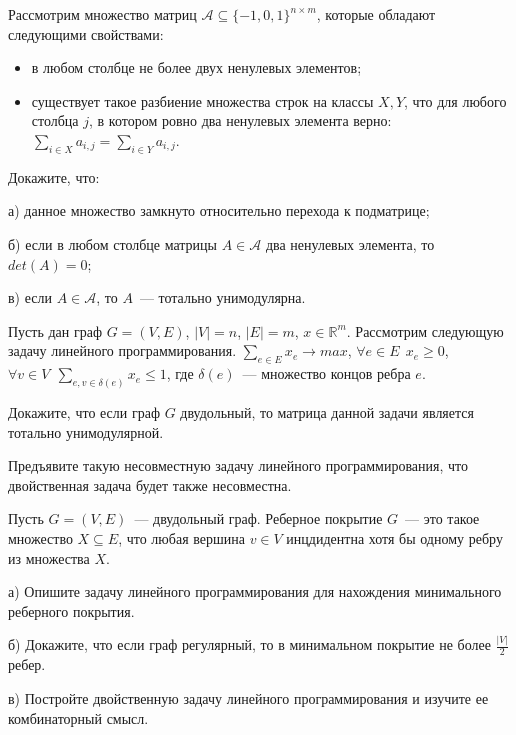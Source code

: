 \setcounter{curtask}{25}


\begin{task}
	Рассмотрим множество матриц $\mathcal{A} \subseteq \{-1, 0, 1\}^{n \times m}$,
	которые обладают следующими свойствами:
    \begin{itemize}
		\item в любом столбце не более двух ненулевых элементов;
    	\item существует такое разбиение множества строк на классы $X, Y$, что
		    для любого столбца $j$, в котором ровно два ненулевых элемента верно:
            $\sum\limits_{i \in X}{a_{i,j}} = \sum\limits_{i \in Y}{a_{i,j}}$.
    \end{itemize}

    Докажите, что:
    
    а) данное множество замкнуто относительно перехода к подматрице;
    
    б) если в любом столбце матрицы $A \in \mathcal{A}$ два ненулевых элемента, то
	$det(A) = 0$;
    
    в) если $A \in \mathcal{A}$, то $A$~--- тотально унимодулярна.
\end{task}


\begin{task}
    Пусть дан граф $G = (V, E)$, $|V| = n$, $|E| = m$, $x \in
    \mathbb{R}^m$. Рассмотрим следующую задачу линейного программирования.
    $\sum_{e \in E} x_e \rightarrow max$, $\forall e \in E ~~ x_e \ge 0$,
    $\forall v \in V ~~ \sum_{e, v \in \delta(e)} x_e \le 1$, где $\delta(e)$~---
    множество концов ребра $e$.

    Докажите, что если граф $G$ двудольный, то матрица данной задачи является
    тотально унимодулярной.
\end{task}

\begin{task}
    Предъявите такую несовместную задачу линейного программирования, что двойственная
    задача будет также несовместна.
\end{task}

\begin{task}
    Пусть $G = (V, E)$~--- двудольный граф. Реберное покрытие $G$~--- это такое
    множество $X \subseteq E$, что любая вершина $v \in V$ инцдидентна хотя бы одному
    ребру из множества $X$.

  	а) Опишите задачу линейного программирования для нахождения минимального
    реберного покрытия.

    б) Докажите, что если граф регулярный, то в минимальном покрытие не более
    $\frac{|V|}{2}$ ребер.

    в) Постройте двойственную задачу линейного программирования и изучите ее
    комбинаторный смысл.
\end{task}



\breakline
